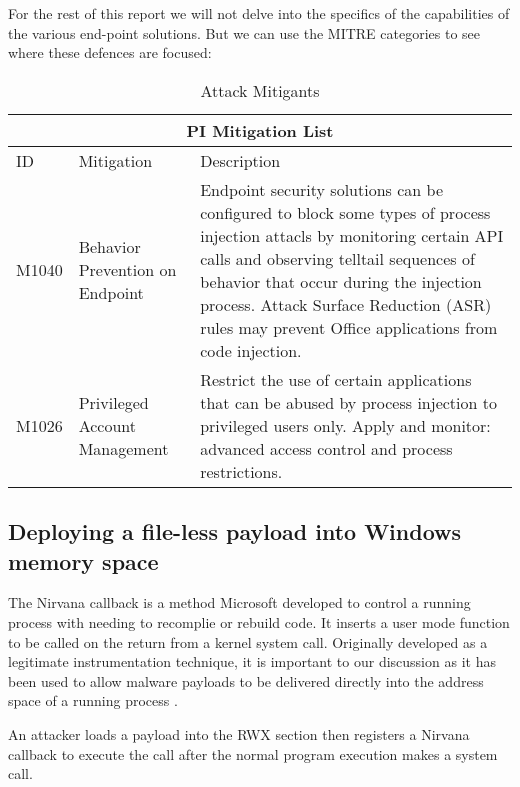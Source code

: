 For the rest of this report we will not delve into the specifics of the capabilities of the various end-point
solutions.
But we can use the MITRE categories to see where these defences are focused:


\begin{table}[!ht]
  \centering
  \caption{Attack Mitigants \autocite{Mitre:2017}}
\begin{tabular}{ |p{1.2cm}||p{2cm}|p{11.5cm}|  }
  \hline
  \multicolumn{3}{|c|}{PI Mitigation List} \\
  \hline
  ID	& Mitigation & Description \\
  \hline
  M1040	& Behavior Prevention on Endpoint &	Endpoint security solutions can be configured to block some types of
                                            process injection attacls by monitoring certain API calls
                                            and observing telltail sequences of behavior that occur during the
                                            injection process.  Attack Surface Reduction (ASR)
                                            rules may prevent Office applications from code injection.\\
  \hline
  M1026 & Privileged Account Management	& Restrict the use of certain applications that can be abused by
                                          process injection to privileged users only. Apply and monitor: advanced access control and
                                          process restrictions. \\
  \hline
\end{tabular}
\label{table: Mitigations}
\end{table}


\subsection{Deploying a file-less payload into Windows memory space}

The Nirvana callback is a method Microsoft developed to control a running process with needing to recomplie or rebuild code.
It inserts a user mode function to be called on the return from a kernel system call.
Originally developed as a legitimate instrumentation technique,
it is important to our discussion as it has been used to allow malware payloads to be delivered directly into the
address space of a running process \autocite{Dequeker:2023}.

An attacker loads a payload into the RWX section then registers a Nirvana callback to execute the call after the normal program
execution makes a system call.

